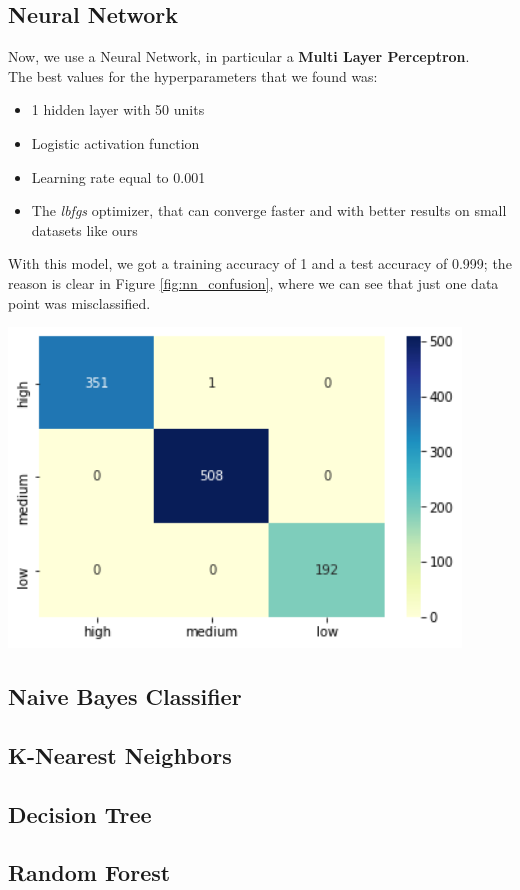 \subsection{Neural Network}
\begin{minipage}{0.6\textwidth}
Now, we use a Neural Network, in particular a \textbf{Multi Layer Perceptron}.\\
The best values for the hyperparameters that we found was:
\begin{itemize}
\item 1 hidden layer with 50 units
\item Logistic activation function
\item Learning rate equal to 0.001
\item The \emph{lbfgs} optimizer, that can converge faster and with better results on small datasets like ours
\end{itemize}

With this model, we got a training accuracy of 1 and a test accuracy of 0.999; the reason is clear in Figure \ref{fig:nn_confusion}, where we can see that just one data point was misclassified.
\end{minipage}
\begin{minipage}{0.4\textwidth}
\centering
\includegraphics[width=0.90\textwidth]{img/nn_confusion.png}
\captionsetup{justification=centering}
\label{fig:nn_confusion}
\end{minipage}

\subsection{Naive Bayes Classifier}

\subsection{K-Nearest Neighbors}

\subsection{Decision Tree}

\subsection{Random Forest}
